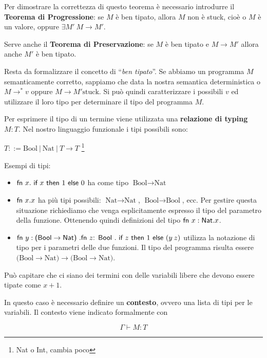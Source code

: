 Per dimostrare la correttezza di questo teorema è necessario introdurre il \textbf{Teorema di Progressione}: se $M$ è ben tipato, allora $M$ non è stuck, cioè o $M$ è un valore, oppure $\exists M' \: M \rightarrow M'$.

Serve anche il \textbf{Teorema di Preservazione}: se $M$ è ben tipato e $M \rightarrow M'$ allora anche $M'$ è ben tipato.

Resta da formalizzare il concetto di ``\textit{ben tipato}''.
Se abbiamo un programma $M$ semanticamente corretto, sappiamo che data la nostra semantica deterministica o $M \rightarrow^* v$ oppure $M \rightarrow M' \text{stuck}$.
Si può quindi caratterizzare i possibili $v$ ed utilizzare il loro tipo per determinare il tipo del programma $M$.

Per esprimere il tipo di un termine viene utilizzata una \textbf{relazione di typing} $M : T$.
Nel nostro linguaggio funzionale i tipi possibili sono:

\begin{center}
$
T ::= \text{Bool} \:|\: \text{Nat} \:|\: T \rightarrow T
$ \footnote{Nat o Int, cambia poco}
\end{center}

Esempi di tipi:
\begin{itemize}
	\item $\fn x.\iif x \then 1 \eelse 0$ ha come tipo $\text{Bool} \rightarrow \text{Nat}$
	\item $\fn x.x$ ha più tipi possibili: $\text{Nat} \rightarrow \text{Nat}$, $\text{Bool} \rightarrow \text{Bool}$, ecc. Per gestire questa situazione richiediamo che venga esplicitamente espresso il tipo del parametro della funzione. Ottenendo quindi definizioni del tipo $\fn x : \text{Nat} .x$.
	\item $\fn y : \text{(Bool} \rightarrow \text{Nat) } . \fn z \text{: Bool }.\iif z \then 1 \eelse (y \: z)$ utilizza la notazione di tipo per i parametri delle due funzioni. Il tipo del programma risulta essere $\text{(Bool}\rightarrow \text{Nat)} \rightarrow \text{(Bool}\rightarrow \text{Nat)}$.
\end{itemize}

Può capitare che ci siano dei termini con delle variabili libere che devono essere tipate come $x + 1$.

In questo caso è necessario definire un \textbf{contesto}, ovvero una lista di tipi per le variabili.
Il contesto viene indicato formalmente con 

$$
\Gamma \vdash M : T
$$

